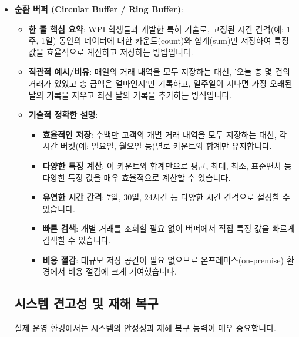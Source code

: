\documentclass[11pt,a4paper]{article}
\theoremstyle{definition}
\begin{document}
\begin{itemize}
\begin{itemize}
\begin{itemize}
\begin{itemize}
\begin{itemize}
    \item \textbf{순환 버퍼 (Circular Buffer / Ring Buffer)}:
    \begin{itemize}
        \item \textbf{한 줄 핵심 요약}: WPI 학생들과 개발한 특허 기술로, 고정된 시간 간격(예: 1주, 1일) 동안의 데이터에 대한 카운트(count)와 합계(sum)만 저장하여 특징 값을 효율적으로 계산하고 저장하는 방법입니다.
        \item \textbf{직관적 예시/비유}: 매일의 거래 내역을 모두 저장하는 대신, '오늘 총 몇 건의 거래가 있었고 총 금액은 얼마인지'만 기록하고, 일주일이 지나면 가장 오래된 날의 기록을 지우고 최신 날의 기록을 추가하는 방식입니다.
        \item \textbf{기술적 정확한 설명}:
        \begin{itemize}
            \item \textbf{효율적인 저장}: 수백만 고객의 개별 거래 내역을 모두 저장하는 대신, 각 시간 버킷(예: 일요일, 월요일 등)별로 카운트와 합계만 유지합니다.
            \item \textbf{다양한 특징 계산}: 이 카운트와 합계만으로 평균, 최대, 최소, 표준편차 등 다양한 특징 값을 매우 효율적으로 계산할 수 있습니다.
            \item \textbf{유연한 시간 간격}: 7일, 30일, 24시간 등 다양한 시간 간격으로 설정할 수 있습니다.
            \item \textbf{빠른 검색}: 개별 거래를 조회할 필요 없이 버퍼에서 직접 특징 값을 빠르게 검색할 수 있습니다.
            \item \textbf{비용 절감}: 대규모 저장 공간이 필요 없으므로 온프레미스(on-premise) 환경에서 비용 절감에 크게 기여했습니다.
        \end{itemize}
    \end{itemize}

\subsection*{시스템 견고성 및 재해 복구}

실제 운영 환경에서는 시스템의 안정성과 재해 복구 능력이 매우 중요합니다.


\end{itemize}
\end{itemize}
\end{itemize}
\end{itemize}
\end{itemize}
\end{document}
